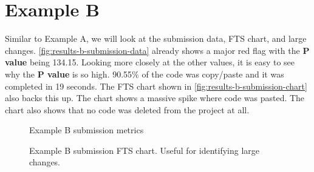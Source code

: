 \newpage

\section{Example B}
Similar to Example A, we will look at the submission data, FTS chart, and large changes. \autoref{fig:results-b-submission-data} already shows a major red flag with the \textbf{P value} being 134.15. Looking more closely at the other values, it is easy to see why the \textbf{P value} is so high. 90.55\% of the code was copy/paste and it was completed in 19 seconds. The FTS chart shown in \autoref{fig:results-b-submission-chart} also backs this up. The chart shows a massive spike where code was pasted. The chart also shows that no code was deleted from the project at all.

\begin{figure}[H]
  \centering
  \caption[Submission Results B Data]{Example B submission metrics}
  \label{fig:results-b-submission-data}
\end{figure}

\begin{figure}[H]
  \centering
  \caption[Submission Results B Chart]{Example B submission FTS chart. Useful for identifying large changes.}
  \label{fig:results-b-submission-chart}
\end{figure}

